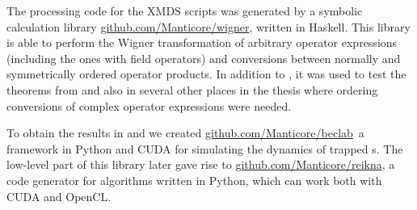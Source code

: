 The processing code for the XMDS scripts was generated by a symbolic calculation library \href{http://github.com/Manticore/wigner}{github.com/Manticore/wigner}, written in Haskell.
This library is able to perform the Wigner transformation of arbitrary operator expressions (including the ones with field operators) and conversions between normally and symmetrically ordered operator products.
In addition to , it was used to test the theorems from  and also in several other places in the thesis where ordering conversions of complex operator expressions were needed.

To obtain the results in  and  we created \href{http://github.com/Manticore/beclab}{github.com/Manticore/beclab} a framework in Python and CUDA for simulating the dynamics of trapped s.
The low-level part of this library later gave rise to \href{http://github.com/Manticore/reikna}{github.com/Manticore/reikna}, a code generator for  algorithms written in Python, which can work both with CUDA and OpenCL.
